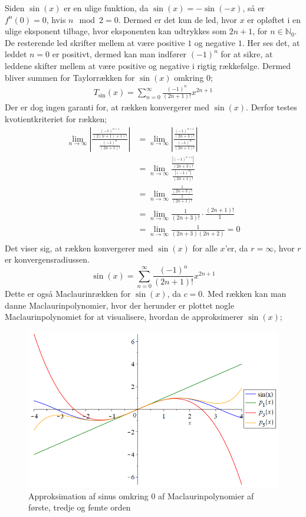 Siden $\sin(x)$ er en ulige funktion, da $\sin(x)=-\sin(-x)$, så er $f^{n}(0)=0$, hvis $n \mod 2=0$. Dermed er det kun de led, hvor $x$ er opløftet i en ulige eksponent tilbage, hvor eksponenten kan udtrykkes som $2n+1$, for $n\in \mathbb{N}_0$. De resterende led skrifter mellem at være positive $1$ og negative $1$. Her ses det, at leddet $n=0$ er positivt, dermed kan man indfører $(-1)^n$ for at sikre, at leddene skifter mellem at være positive og negative i rigtig rækkefølge. Dermed bliver summen for Taylorrækken for $\sin(x)$ omkring $0$;
\begin{align*}
T_{\sin}(x)=\sum_{n=0}^{\infty} \frac{(-1)^n}{(2n+1)!}x^{2n+1}
\end{align*}
Der er dog ingen garanti for, at rækken konvergerer med $\sin(x)$. Derfor testes kvotientkriteriet for rækken;
\begin{align*}
\lim\limits_{n \to \infty}
\left\lvert
\frac{\frac{(-1)^{n+1}}{(2(n+1)+1)!}}
{\frac{(-1)^n}{(2n+1)!}} 
\right\lvert
&=
\lim\limits_{n \to \infty}
\left\lvert
\frac{\frac{(-1)^{n+1}}{(2n+3)!}}
{\frac{(-1)^n}{(2n+1)!}}
\right\lvert 
\\
&=
\lim\limits_{n \to \infty}
\frac{\frac{\left\lvert (-1)^{n+1} \right\lvert }{(2n+3)!}}
{\frac{\left\lvert (-1)^n \right\lvert }{(2n+1)!}}
\\
&=
\lim\limits_{n \to \infty}
\frac{\frac{1}{(2n+3)!}}
{\frac{1}{(2n+1)!} }
\\
&=
\lim\limits_{n \to \infty}
\frac{1}{(2n+3)!}
\cdot
\frac{(2n+1)!}{1}
\\
&=
\lim\limits_{n \to \infty}
\frac{1}{(2n+3)(2n+2)}
=0 \\
\end{align*}
Det viser sig, at rækken konvergerer med $\sin(x)$ for alle $x$'er, da $r=\infty$, hvor $r$ er konvergensradiussen.
\begin{equation}\label{eq:sinrække}
\sin(x)=\sum_{n=0}^{\infty} \frac{(-1)^n}{(2n+1)!}x^{2n+1}
\end{equation}
Dette er også Maclaurinrækken for $\sin(x)$, da $c=0$. Med rækken kan man danne Maclaurinpolynomier, hvor der herunder er plottet nogle Maclaurinpolynomiet for at visualisere, hvordan de approksimerer $\sin(x)$;
\begin{figure}[H]
	\centering
	\includegraphics[scale=0.4]{fig/img/taylor_sin}
	\caption{Approksimation af sinus omkring 0 af Maclaurinpolynomier af første, tredje og femte orden}
 	\label{fig:taylor_sin}
\end{figure}
